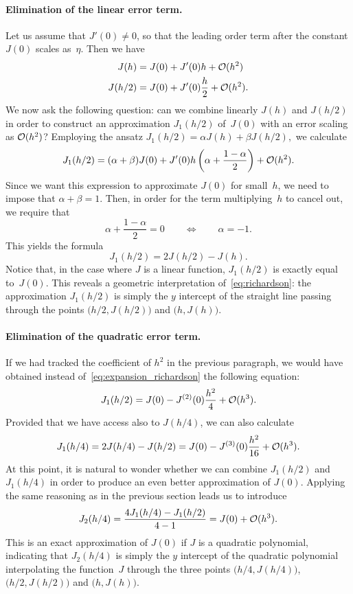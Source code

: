 \paragraph{Elimination of the linear error term.}
Let us assume that $J'(0) \neq 0$,
so that the leading order term after the constant $J(0)$ scales as~$\eta$.
Then we have
\begin{align*}
    J(h) &= J(0) + J'(0) h + \mathcal O(h^2) \\
    J(h/2) &= J(0) + J'(0) \frac{h}{2} + \mathcal O(h^2).
\end{align*}
We now ask the following question:
can we combine linearly $J(h)$ and $J(h/2)$ in order to construct an approximation $J_1(h/2)$ of~$J(0)$ with an error scaling as $\mathcal O(h^2)$?
Employing the ansatz
\(
    J_1(h/2) = \alpha J(h) + \beta J(h/2),
\)
we calculate
\begin{equation}
    \label{eq:expansion_richardson}
    J_1(h/2) = (\alpha + \beta) J(0) + J'(0) h \left(\alpha + \frac{1 - \alpha}{2}\right) + \mathcal O(h^2).
\end{equation}
Since we want this expression to approximate $J(0)$ for small~$h$,
we need to impose that $\alpha + \beta = 1$.
Then, in order for the term multiplying~$h$ to cancel out,
we require that
\[
    \alpha + \frac{1 - \alpha}{2} = 0
    \qquad \Leftrightarrow \qquad
    \alpha = - 1.
\]
This yields the formula
\begin{equation}
    \label{eq:richardson}
    J_1(h/2) = 2J(h/2) - J(h).
\end{equation}
Notice that, in the case where $J$ is a linear function,
$J_1(h/2)$ is exactly equal to~$J(0)$.
This reveals a geometric interpretation of~\eqref{eq:richardson}:
the approximation $J_1(h/2)$ is simply the $y$ intercept of the straight line passing through the points $\bigl(h/2, J(h/2)\bigr)$ and $\bigl(h, J(h)\bigr)$.

\paragraph{Elimination of the quadratic error term.}
If we had tracked the coefficient of $h^2$ in the previous paragraph,
we would have obtained instead of~\eqref{eq:expansion_richardson} the following equation:
\[
    J_1(h/2) = J(0) - J^{(2)}(0) \frac{h^2}{4} + \mathcal O(h^3).
\]
Provided that we have access also to $J(h/4)$,
we can also calculate
\[
   J_1(h/4) = 2J(h/4) - J(h/2) = J(0) - J^{(3)}(0) \frac{h^2}{16} + \mathcal O(h^3).
\]
At this point,
it is natural to wonder whether we can combine $J_1(h/2)$ and $J_1(h/4)$ in order to produce an even better approximation of $J(0)$.
Applying the same reasoning as in the previous section leads us to introduce
\[
    J_2(h/4) = \frac{4 J_1(h/4) - J_1(h/2)}{4 - 1} = J(0) + \mathcal O(h^3).
\]
This is an exact approximation of $J(0)$ if $J$ is a quadratic polynomial,
indicating that $J_2(h/4)$ is simply the $y$ intercept of the quadratic polynomial interpolating the function~$J$ through the three points
$\bigl(h/4, J(h/4)\bigr)$, $\bigl(h/2, J(h/2)\bigr)$ and $\bigl(h, J(h)\bigr)$.

